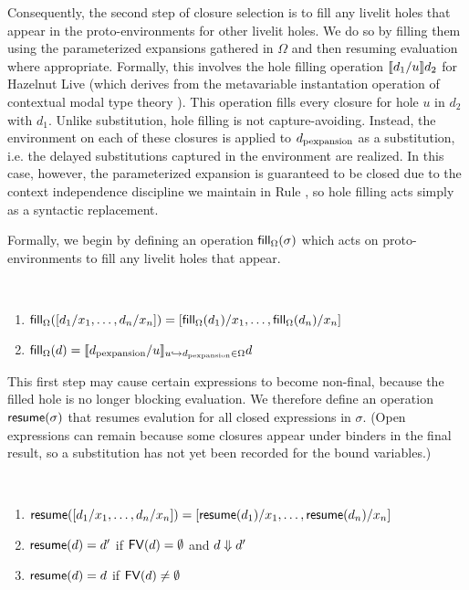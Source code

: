 Consequently, the second step of closure selection is to fill any livelit holes that appear in the proto-environments for other livelit holes.
We do so by filling them using the parameterized expansions gathered in $\Omega$ and then resuming
evaluation where appropriate.
Formally, this involves the hole filling operation $\llbracket d_1 / u\rrbracket d_2$ for Hazelnut Live
(which derives from the metavariable instantation operation of contextual modal type theory \cite{HazelnutLive,Nanevski2008}).
This operation
fills every closure for hole $u$ in $d_2$ with $d_1$.
Unlike substitution, hole filling is
not capture-avoiding. Instead, the environment on each of these closures is applied to $d_\text{pexpansion}$
as a substitution, i.e. the delayed substitutions captured in the environment are realized.
In this case, however, the parameterized expansion is guaranteed to be closed due to
the context independence discipline we maintain in Rule ,
so hole filling acts simply as a syntactic replacement.

Formally, we begin by defining an operation $\mathsf{fill}_{\Omega}(\sigma)$ which acts on proto-environments
to fill any livelit holes that appear.
\begin{definition} ~
    \begin{enumerate}
        \item $\mathsf{fill}_{\Omega}([d_1/x_1, \ldots, d_n/x_n]) = [\mathsf{fill}_{\Omega}(d_1)/x_1, \ldots, \mathsf{fill}_{\Omega}(d_n)/x_n]$
        \item $\mathsf{fill}_{\Omega}(d) = \llbracket d_\text{pexpansion} / u\rrbracket_{u \hookrightarrow d_\text{pexpansion} \in \Omega}{d}$
    \end{enumerate}
\end{definition}

This first step may cause certain expressions to become non-final, because the filled hole is no longer
blocking evaluation. We therefore define an operation $\mathsf{resume}(\sigma)$ that resumes evalution for all closed expressions in $\sigma$.
(Open expressions can remain because some closures appear under binders in the final result, so a substitution has not yet been recorded
for the bound variables.)
\begin{definition} ~
    \begin{enumerate}
        \item $\mathsf{resume}([d_1/x_1, \ldots, d_n/x_n]) = [\mathsf{resume}(d_1)/x_1, \ldots, \mathsf{resume}(d_n)/x_n]$
        \item $\mathsf{resume}(d) = d'$ if $\mathsf{FV}(d) = \emptyset$ and $d \Downarrow d'$
        \item $\mathsf{resume}(d) = d$ if $\mathsf{FV}(d) \neq \emptyset$
    \end{enumerate}
\end{definition}

